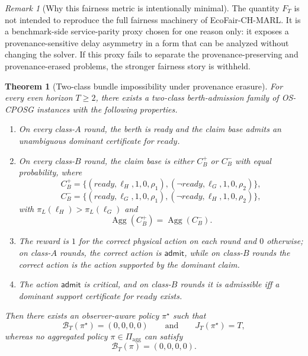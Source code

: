 \documentclass[11pt]{article}
\newcommand{\OSCPOSG}{\mbox{\normalfont\textsc{OS-CPOSG}}}
\newcommand{\Agg}{\operatorname{Agg}}
\newcommand{\1}{\mathbf{1}}
\theoremstyle{definition}
\theoremstyle{plain}
\newtheorem{theorem}[definition]{Theorem}
\theoremstyle{remark}
\newtheorem{remark}[definition]{Remark}
\begin{document}
\begin{remark}[Why this fairness metric is intentionally minimal]
\label{supp:rem:minimal-fairness}
The quantity $F_T$ is not intended to reproduce the full fairness machinery of EcoFair-CH-MARL. It is a benchmark-side service-parity proxy chosen for one reason only: it exposes a provenance-sensitive delay asymmetry in a form that can be analyzed without changing the solver. If this proxy fails to separate the provenance-preserving and provenance-erased problems, the stronger fairness story is withheld.
\end{remark}

\begin{theorem}[Two-class bundle impossibility under provenance erasure]
\label{supp:thm:bundle-impossibility}
For every even horizon $T\ge 2$, there exists a two-class berth-admission family of \OSCPOSG{} instances with the following properties.
\begin{enumerate}[leftmargin=1.6em,label=(\roman*)]
\item On every class-$A$ round, the berth is ready and the claim base admits an unambiguous dominant certificate for $ready$.
\item On every class-$B$ round, the claim base is either $C_B^+$ or $C_B^-$ with equal probability, where
\[
C_B^+
=
\{(ready,\ell_H,1,0,\rho_1),(\neg ready,\ell_G,1,0,\rho_2)\},
\]
\[
C_B^-
=
\{(ready,\ell_G,1,0,\rho_1),(\neg ready,\ell_H,1,0,\rho_2)\},
\]
with $\pi_L(\ell_H)>\pi_L(\ell_G)$ and
\[
\Agg(C_B^+)=\Agg(C_B^-).
\]
\item The reward is $1$ for the correct physical action on each round and $0$ otherwise; on class-$A$ rounds, the correct action is $\mathsf{admit}$, while on class-$B$ rounds the correct action is the action supported by the dominant claim.
\item The action $\mathsf{admit}$ is critical, and on class-$B$ rounds it is admissible iff a dominant support certificate for $ready$ exists.
\end{enumerate}
Then there exists an observer-aware policy $\pi^{\star}$ such that
\[
\mathcal B_T(\pi^{\star})=(0,0,0,0)
\qquad\text{and}\qquad
J_T(\pi^{\star})=T,
\]
whereas no aggregated policy $\pi\in\Pi_{\mathrm{agg}}$ can satisfy
\[
\mathcal B_T(\pi)=(0,0,0,0).
\]
\end{theorem}
\end{document}
